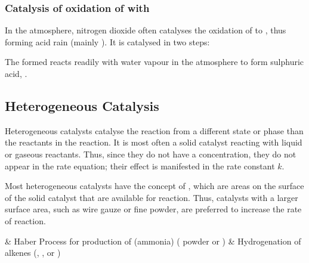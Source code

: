 

			\subsubsection{Catalysis of oxidation of \texorpdfstring{}{SO₂} with \texorpdfstring{}{NO₂}}

				In the atmosphere, nitrogen dioxide often catalyses the oxidation of  to , thus
				forming acid rain (mainly ). It is catalysed in two steps:


				The  formed reacts readily with water vapour in the atmosphere to form sulphuric acid, .





		\pagebreak
		\subsection{Heterogeneous Catalysis}

			Heterogeneous catalysts catalyse the reaction from a different state or phase than the reactants in the reaction. It is most
			often a solid catalyst reacting with liquid or gaseous reactants. Thus, since they do not have a concentration, they do not
			appear in the rate equation; their effect is manifested in the rate constant $k$.

			Most heterogeneous catalysts have the concept of , which are areas on the surface of the solid catalyst
			that are available for reaction. Thus, catalysts with a larger surface area, such as wire gauze or fine powder, are preferred to
			increase the rate of reaction.

			\begin{bulletlist}
				& Haber Process for production of  (ammonia) ( powder or )
				& Hydrogenation of alkenes (, , or )
			\end{bulletlist}


